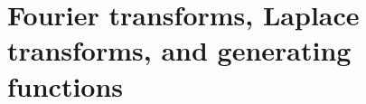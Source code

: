 
\chapter{Fourier transforms, Laplace transforms, and generating functions\label{chap:fourierTransforms}}


